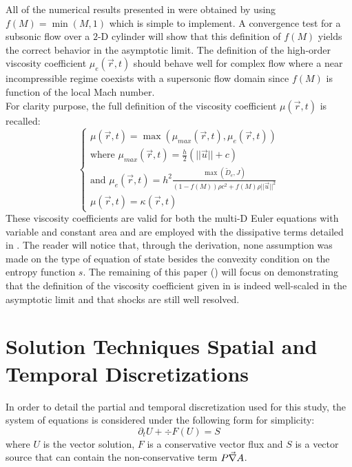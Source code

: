 All of the numerical results presented in  were obtained by using $f(M) = \min (M,1)$ which is simple to implement. A convergence test for a subsonic flow over a $2$-D cylinder will show that this definition of $f(M)$ yields the correct behavior in the asymptotic limit.
The definition of the high-order viscosity coefficient $\mu_e(\vec{r},t)$ should behave well for complex flow where a near incompressible regime coexists with a supersonic flow domain since $f(M)$ is function of the local Mach number. \\
For clarity purpose, the full definition of the viscosity coefficient $\mu(\vec{r},t)$ is recalled:
\begin{equation}
\label{eq:final_def_visc_coeff}
\left\{
\begin{array}{l}
\mu(\vec{r},t) = \max (\mu_{max}(\vec{r},t), \mu_e (\vec{r},t)) \\
\text{where } \mu_{max}(\vec{r},t) = \frac{h}{2} (||\vec{u}|| + c) \\
\text{and } \mu_e(\vec{r},t) = h^2 \frac{\max (\tilde{D}_e, J)}{(1-f(M) )\rho c^2 + f(M) \rho || \vec{u} ||^2} \\
\mu(\vec{r},t) = \kappa(\vec{r},t)
\end{array}
\right.
\end{equation}
These viscosity coefficients are valid for both the multi-D Euler equations with variable and constant area and are employed with the dissipative terms detailed in . The reader will notice that, through the derivation, none assumption was made on the type of equation of state besides the convexity condition on the entropy function $s$. The remaining of this paper () will focus on demonstrating that the definition of the viscosity coefficient given in  is indeed well-scaled in the asymptotic limit and that shocks are still well resolved. 
\section{Solution Techniques Spatial and Temporal Discretizations} \label{sec:solution_tech}
In order to detail the partial and temporal discretization used for this study, the system of equations  is considered under the following form for simplicity:
\begin{equation}
\label{eq:form}
\partial_t U + \div F\left( U \right) = S
\end{equation}
where $U$ is the vector solution, $F$ is a conservative vector flux and $S$ is a vector source that can contain the non-conservative term $P\vec{\nabla} A$.
